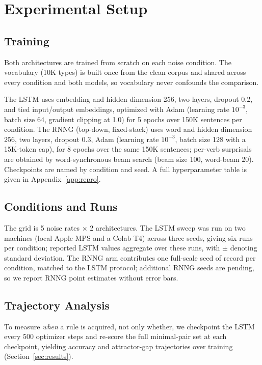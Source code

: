 \section{Experimental Setup}
\label{sec:experiments}


\subsection{Training}
\label{sec:training}
Both architectures are trained from scratch on each noise condition. The
vocabulary (10K types) is built once from the clean corpus and shared across
every condition and both models, so vocabulary never confounds the comparison.

The LSTM uses embedding and hidden dimension 256, two layers, dropout 0.2, and
tied input/output embeddings, optimized with Adam (learning rate $10^{-3}$,
batch size 64, gradient clipping at 1.0) for 5 epochs over 150K sentences per
condition. The RNNG (top-down, fixed-stack) uses word and hidden dimension 256,
two layers, dropout 0.3, Adam (learning rate $10^{-3}$, batch size 128 with a
15K-token cap), for 8 epochs over the same 150K sentences; per-verb surprisals
are obtained by word-synchronous beam search (beam size 100, word-beam 20).
Checkpoints are named by condition and seed. A full hyperparameter table is given
in Appendix~\ref{app:repro}.

\subsection{Conditions and Runs}
\label{sec:runs}
The grid is 5 noise rates $\times$ 2 architectures. The LSTM sweep was run on
two machines (local Apple MPS and a Colab T4) across three seeds, giving six
runs per condition; reported LSTM values aggregate over these runs, with $\pm$
denoting standard deviation. The RNNG arm contributes one full-scale seed of
record per condition, matched to the LSTM protocol; additional RNNG seeds are
pending, so we report RNNG point estimates without error bars.

\subsection{Trajectory Analysis}
\label{sec:trajectory}
To measure \emph{when} a rule is acquired, not only whether, we checkpoint the
LSTM every 500 optimizer steps and re-score the full minimal-pair set at each
checkpoint, yielding accuracy and attractor-gap trajectories over training
(Section~\ref{sec:results}).

